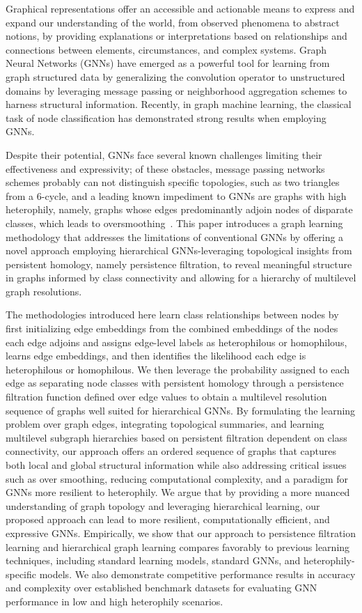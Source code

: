 Graphical representations offer an accessible and actionable means to express and expand our understanding of the world, from observed phenomena to abstract notions, by providing explanations or interpretations based on relationships and connections between elements, circumstances, and complex systems. Graph Neural Networks (GNNs) have emerged as a powerful tool for learning from graph structured data by generalizing the convolution operator to unstructured domains by leveraging message passing or neighborhood aggregation schemes to harness structural information. Recently, in graph machine learning, the classical task of node classification has demonstrated strong results when employing GNNs. 

Despite their potential, GNNs face several known challenges limiting their effectiveness and expressivity; of these obstacles, message passing networks schemes probably can not distinguish specific topologies, such as two triangles from a 6-cycle, and a leading known impediment to GNNs are graphs with high heterophily, namely, graphs whose edges predominantly adjoin nodes of disparate classes, which leads to oversmoothing~\cite{murphy2019relational,sato2021random,li2018deeper}. This paper introduces a graph learning methodology that addresses the limitations of conventional GNNs by offering a novel approach employing hierarchical GNNs-leveraging topological insights from persistent homology, namely persistence filtration, to reveal meaningful structure in graphs informed by class connectivity and allowing for a hierarchy of multilevel graph resolutions. 

The methodologies introduced here learn class relationships between nodes by first initializing edge embeddings from the combined embeddings of the nodes each edge adjoins and assigns edge-level labels as heterophilous or homophilous, learns edge embeddings, and then identifies the likelihood each edge is heterophilous or homophilous. We then leverage the probability assigned to each edge as separating node classes with persistent homology through a persistence filtration function defined over edge values to obtain a multilevel resolution sequence of graphs well suited for hierarchical GNNs. By formulating the learning problem over graph edges, integrating topological summaries, and learning multilevel subgraph hierarchies based on persistent filtration dependent on class connectivity, our approach offers an ordered sequence of graphs that captures both local and global structural information while also addressing critical issues such as over smoothing, reducing computational complexity, and a paradigm for GNNs more resilient to heterophily. We argue that by providing a more nuanced understanding of graph topology and leveraging hierarchical learning, our proposed approach can lead to more resilient, computationally efficient, and expressive GNNs. Empirically, we show that our approach to persistence filtration learning and hierarchical graph learning compares favorably to previous learning techniques, including standard learning models, standard GNNs, and heterophily-specific models. We also demonstrate competitive performance results in accuracy and complexity over established benchmark datasets for evaluating GNN performance in low and high heterophily scenarios.


